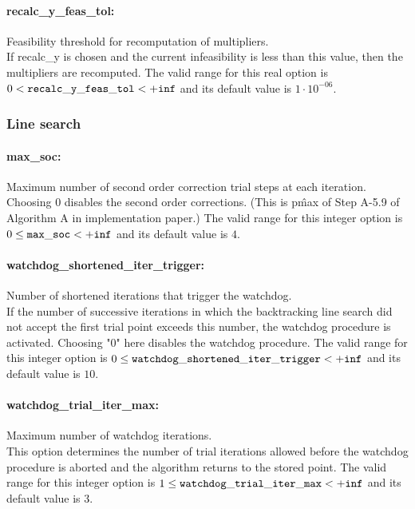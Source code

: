 \paragraph{recalc\_y\_feas\_tol:} Feasibility threshold for recomputation of multipliers. $\;$ \\
 If recalc\_y is chosen and the current
infeasibility is less than this value, then the
multipliers are recomputed. The valid range for this real option is 
$0 <  {\tt recalc\_y\_feas\_tol } <  {\tt +inf}$
and its default value is $1 \cdot 10^{-06}$.

\subsubsection{Line search}

\paragraph{max\_soc:} Maximum number of second order correction trial steps at each iteration. $\;$ \\
 Choosing 0 disables the second order corrections.
(This is p\^{max} of Step A-5.9 of Algorithm A in
implementation paper.) The valid range for this integer option is
$0 \le {\tt max\_soc } <  {\tt +inf}$
and its default value is $4$.


\paragraph{watchdog\_shortened\_iter\_trigger:} Number of shortened iterations that trigger the watchdog. $\;$ \\
 If the number of successive iterations in which
the backtracking line search did not accept the
first trial point exceeds this number, the
watchdog procedure is activated.  Choosing "0"
here disables the watchdog procedure. The valid range for this integer option is
$0 \le {\tt watchdog\_shortened\_iter\_trigger } <  {\tt +inf}$
and its default value is $10$.


\paragraph{watchdog\_trial\_iter\_max:} Maximum number of watchdog iterations. $\;$ \\
 This option determines the number of trial
iterations allowed before the watchdog procedure
is aborted and the algorithm returns to the
stored point. The valid range for this integer option is
$1 \le {\tt watchdog\_trial\_iter\_max } <  {\tt +inf}$
and its default value is $3$.

